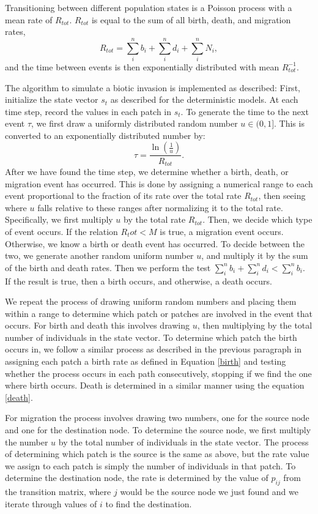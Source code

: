 \documentclass[12pt, openany]{book}
\theoremstyle{definition}
\theoremstyle{remark}
\numberwithin{equation}{chapter}
\numberwithin{figure}{chapter}
\begin{document}
Transitioning between different population states is a Poisson process with a mean rate of $R_{tot}$. $R_{tot}$ is equal to the sum of all birth, death, and migration rates,
$$R_{tot} = \sum_{i}^{n}b_i + \sum_{i}^{n}d_i + \sum_{i}^{n}N_i,$$ 
and the time between events is then exponentially distributed with mean $R_{tot}^{-1}$. 

The algorithm to simulate a biotic invasion is implemented as described:
First, initialize the state vector $s_t$ as described for the deterministic models.
At each time step, record the values in each patch in $s_t$.
To generate the time to the next event $\tau$, we first draw a uniformly distributed random number $u \in (0,1]$. This is converted to an exponentially distributed number by:
\begin{equation}\label{uniftoexp}
\tau = \frac{\ln(\frac{1}{u})}{R_{tot}}.
\end{equation}
After we have found the time step, we determine whether a birth, death, or migration event has occurred. This is done by assigning a numerical range to each event proportional to the fraction of its rate over the total rate $R_{tot}$, then seeing where $u$ falls relative to these ranges after normalizing it to the total rate. Specifically, we first multiply $u$ by the total rate $R_{tot}$. Then, we decide which type of event occurs. If the relation $R_tot < M$ is true, a migration event occurs. Otherwise, we know a birth or death event has occurred. To decide between the two, we generate another random uniform number $u$, and multiply it by the sum of the birth and death rates. Then we perform the test $\sum_{i}^{n}b_i + \sum_{i}^{n}d_i < \sum_{i}^{n}b_i$. If the result is true, then a birth occurs, and otherwise, a death occurs. 

We repeat the process of drawing uniform random numbers and placing them within a range to determine which patch or patches are involved in the event that occurs. For birth and death this involves drawing $u$, then multiplying by the total number of individuals in the state vector. To determine which patch the birth occurs in, we follow a similar process as described in the previous paragraph in assigning each patch a birth rate as defined in Equation \ref{birth} and testing whether the process occurs in each path consecutively, stopping if we find the one where birth occurs. Death is determined in a similar manner using the equation \ref{death}. 

For migration the process involves drawing two numbers, one for the source node and one for the destination node. To determine the source node, we first multiply the number $u$ by the total number of individuals in the state vector. The process of determining which patch is the source is the same as above, but the rate value we assign to each patch is simply the number of individuals in that patch. To determine the destination node, the rate is determined by the value of $p_{ij}$ from the transition matrix, where $j$ would be the source node we just found and we iterate through values of $i$ to find the destination.
\end{document}
